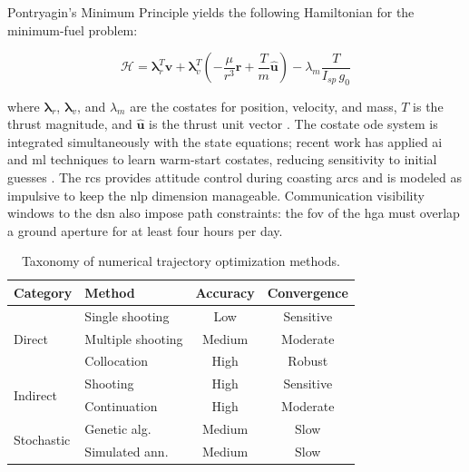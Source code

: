 \documentclass[dissertation, bookmarks]{../example/tex/grizz_thesis}
\begin{document}
\blindtext[2]

Pontryagin's Minimum Principle yields the following Hamiltonian for the minimum-fuel problem:

\begin{equation}
  \mathcal{H} = \boldsymbol{\lambda}_r^T \mathbf{v}
                + \boldsymbol{\lambda}_v^T\!\left(-\frac{\mu}{r^3}\mathbf{r}
                + \frac{T}{m}\hat{\mathbf{u}}\right)
                - \lambda_m \frac{T}{I_{sp}\,g_0}
  \label{eq:hamiltonian}
\end{equation}

\noindent where $\boldsymbol{\lambda}_r$, $\boldsymbol{\lambda}_v$, and $\lambda_m$ are the
costates for position, velocity, and mass, $T$ is the thrust magnitude, and $\hat{\mathbf{u}}$ is
the thrust unit vector \cite{bryson1975applied}.
The costate \gls{ode} system is integrated simultaneously with the state equations; recent work
has applied \gls{ai} and \gls{ml} techniques to learn warm-start costates, reducing sensitivity to
initial guesses \cite{chen2022neural, federici2021deep}.
The \gls{rcs} provides attitude control during coasting arcs and is modeled as impulsive to keep
the \gls{nlp} dimension manageable.
Communication visibility windows to the \gls{dsn} also impose path constraints: the \gls{fov}
of the \gls{hga} must overlap a ground aperture for at least four hours per day.

\blindtext

\begin{table}[htbp]
  \caption{Taxonomy of numerical trajectory optimization methods.}
  \label{tab:ch2-methods}
  \centering
  \begin{tabular}{llcc}
    \toprule
    \textbf{Category} & \textbf{Method} & \textbf{Accuracy} & \textbf{Convergence} \\
    \midrule
    \multirow{3}{*}{Direct} & Single shooting  & Low    & Sensitive \\
                            & Multiple shooting & Medium & Moderate  \\
                            & Collocation       & High   & Robust    \\
    \midrule
    \multirow{2}{*}{Indirect} & Shooting     & High  & Sensitive \\
                              & Continuation & High  & Moderate  \\
    \midrule
    \multirow{2}{*}{Stochastic} & Genetic alg. & Medium & Slow \\
                                & Simulated ann. & Medium & Slow \\
    \bottomrule
  \end{tabular}
\end{table}
\end{document}
